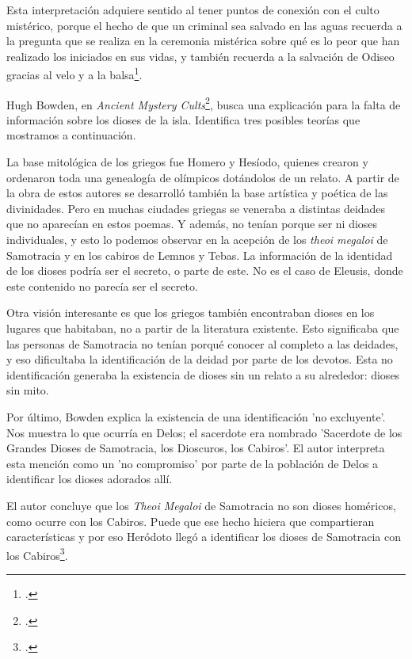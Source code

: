 Esta interpretación adquiere sentido al tener puntos de conexión con el culto mistérico, porque el hecho de que un criminal sea salvado en las aguas recuerda a la pregunta que se realiza en la ceremonia mistérica sobre qué es lo peor que han realizado los iniciados en sus vidas, y también recuerda a la salvación de Odiseo gracias al velo y a la balsa\footcite[378]{burkertReligionGriegaArcaica2007}.

Hugh Bowden, en \textit{Ancient Mystery Cults}\footcite[80-81]{bowdenMysteryCultsAncient2023}, busca una explicación para la falta de información sobre los dioses de la isla. Identifica tres posibles teorías que mostramos a continuación. 

La base mitológica de los griegos fue Homero y Hesíodo, quienes crearon y ordenaron toda una genealogía de olímpicos dotándolos de un relato. A partir de la obra de estos autores se desarrolló también la base artística y poética de las divinidades. Pero en muchas ciudades griegas se veneraba a distintas deidades que no aparecían en estos poemas. Y además, no tenían porque ser ni dioses individuales, y esto lo podemos observar en la acepción de los \textit{theoi megaloi}  de Samotracia y en los cabiros de Lemnos y Tebas. La información de la identidad de los dioses podría ser el secreto, o parte de este. No es el caso de Eleusis, donde este contenido no parecía ser el secreto. 

Otra visión interesante es que los griegos también encontraban dioses en los lugares que habitaban, no a partir de la literatura existente. Esto significaba que las personas de Samotracia no tenían porqué conocer al completo a las deidades, y eso dificultaba la identificación de la deidad por parte de los devotos. Esta no identificación generaba la existencia de dioses sin un relato a su alrededor: dioses sin mito.

Por último, Bowden explica la existencia de una identificación 'no excluyente'. Nos muestra lo que ocurría en Delos; el sacerdote era nombrado 'Sacerdote de los Grandes Dioses de Samotracia, los Dioscuros, los Cabiros'. El autor interpreta esta mención como un 'no compromiso' por parte de la población de Delos a identificar los dioses adorados allí. 

El autor concluye que los \textit{Theoi Megaloi} de Samotracia no son dioses homéricos, como ocurre con los Cabiros. Puede que ese hecho hiciera que compartieran características y por eso Heródoto llegó a  identificar los dioses de Samotracia con los Cabiros\footcite[82]{bowdenMysteryCultsAncient2023}. 

